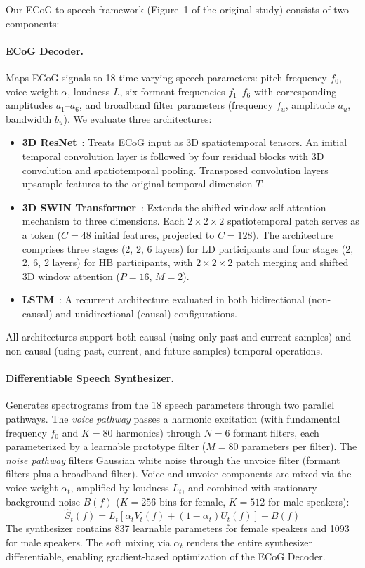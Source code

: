 \documentclass[11pt]{article}
\begin{document}
Our ECoG-to-speech framework (Figure~1 of the original study) consists of two components:

\paragraph{ECoG Decoder.} Maps ECoG signals to 18 time-varying speech parameters: pitch frequency $f_0$, voice weight $\alpha$, loudness $L$, six formant frequencies $f_1$--$f_6$ with corresponding amplitudes $a_1$--$a_6$, and broadband filter parameters (frequency $f_u$, amplitude $a_u$, bandwidth $b_u$). We evaluate three architectures:

\begin{itemize}
    \item \textbf{3D ResNet}~\citep{he2016deep}: Treats ECoG input as 3D spatiotemporal tensors. An initial temporal convolution layer is followed by four residual blocks with 3D convolution and spatiotemporal pooling. Transposed convolution layers upsample features to the original temporal dimension $T$.
    \item \textbf{3D SWIN Transformer}~\citep{liu2021swin}: Extends the shifted-window self-attention mechanism to three dimensions. Each $2\times2\times2$ spatiotemporal patch serves as a token ($C=48$ initial features, projected to $C=128$). The architecture comprises three stages (2, 2, 6 layers) for LD participants and four stages (2, 2, 6, 2 layers) for HB participants, with $2\times2\times2$ patch merging and shifted 3D window attention ($P=16$, $M=2$).
    \item \textbf{LSTM}~\citep{hochreiter1997long}: A recurrent architecture evaluated in both bidirectional (non-causal) and unidirectional (causal) configurations.
\end{itemize}

All architectures support both causal (using only past and current samples) and non-causal (using past, current, and future samples) temporal operations.

\paragraph{Differentiable Speech Synthesizer.} Generates spectrograms from the 18 speech parameters through two parallel pathways. The \emph{voice pathway} passes a harmonic excitation (with fundamental frequency $f_0$ and $K=80$ harmonics) through $N=6$ formant filters, each parameterized by a learnable prototype filter ($M=80$ parameters per filter). The \emph{noise pathway} filters Gaussian white noise through the unvoice filter (formant filters plus a broadband filter). Voice and unvoice components are mixed via the voice weight $\alpha_t$, amplified by loudness $L_t$, and combined with stationary background noise $B(f)$ ($K=256$ bins for female, $K=512$ for male speakers):
\begin{equation}
    \hat{S}_t(f) = L_t \left[\alpha_t V_t(f) + (1-\alpha_t) U_t(f)\right] + B(f)
\end{equation}
The synthesizer contains 837 learnable parameters for female speakers and 1093 for male speakers. The soft mixing via $\alpha_t$ renders the entire synthesizer differentiable, enabling gradient-based optimization of the ECoG Decoder.
\end{document}
